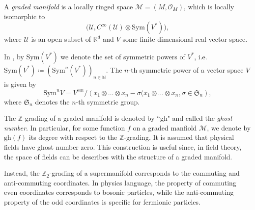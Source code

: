 \begin{definition}
    \label{def:graded_manifold}
    A \emph{graded manifold} is a locally ringed space $\mathcal{M} = (M, \mathcal{O}_M)$, which is locally isomorphic to
    \begin{equation*}
        \Big(\mathcal{U}, C^\infty(\mathcal{U}) \otimes \text{Sym}(V^*) \Big),
    \end{equation*}
    where $\mathcal{U}$ is an open subset of $\mathbb{R}^d$ and $V$ some finite-dimensional real vector space.
\end{definition}
 In , by $\text{Sym}(V^*)$ we denote the set of symmetric powers of $V^*$, i.e. $\text{Sym}(V^*) \coloneqq \left( \text{Sym}^n(V^*) \right)_{n \in \mathbb{N}}$. The $n$-th symmetric power of a vector space $V$ is given by
 \begin{equation*}
     \text{Sym}^n V =
     V^{\otimes n} /
     \left( x_1 \otimes \ldots \otimes x_n - \sigma (x_1 \otimes \ldots \otimes x_n,
     \sigma \in \mathfrak{S}_n \right),
 \end{equation*}
 where $\mathfrak{S}_n$ denotes the $n$-th symmetric group.

The $\mathbb{Z}$-grading of a graded manifold is denoted by “gh" and called the \emph{ghost number}.
In particular, for some function $f$ on a graded manfiold $\mathcal{M}$, we denote by $\text{gh}(f)$ its degree with respect to the $\mathbb{Z}$-grading.
It is assumed that physical fields have ghost number zero.
This construction is useful since, in field theory, the space of fields can be describes with the structure of a graded manifold.

Instead, the $\mathbb{Z}_2$-grading of a supermanifold corresponds to the commuting and anti-commuting coordinates.
In physics language, the property of commuting even coordinates corresponds to bosonic particles, while the anti-commuting property of the odd coordinates is specific for fermionic particles.
